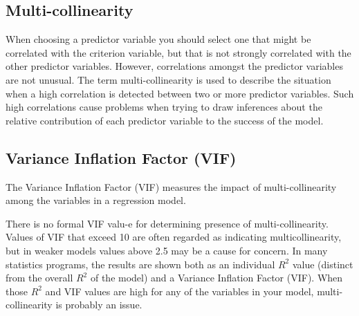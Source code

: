 \documentclass[a4paper,12pt]{article}
\begin{document}


\subsection{Multi-collinearity}
When choosing a predictor variable you should select one that might be correlated with the criterion variable, but that is not strongly correlated with the other predictor variables. However, correlations amongst the predictor variables are not unusual. The term multi-collinearity  is used to describe the situation
when a high correlation is detected between two or more predictor variables.
Such high correlations cause problems when trying to draw inferences about the relative contribution of each predictor variable to the success of the model. 

\subsection{Variance Inflation Factor (VIF)}



The Variance Inflation Factor (VIF) measures the impact of multi-collinearity among the variables in a regression model. 

There is no formal VIF valu-e for determining presence of multi-collinearity. Values of VIF that exceed 10 are often regarded as indicating multicollinearity, but in weaker models values above 2.5 may be a cause for concern. In many statistics programs, the results are shown both as an individual $R^2$ value (distinct from the overall $R^2$ of the model) and a Variance Inflation Factor (VIF). When those $R^2$ and VIF values are high for any of the variables in your model, multi-collinearity is probably an issue. 


\end{document}
